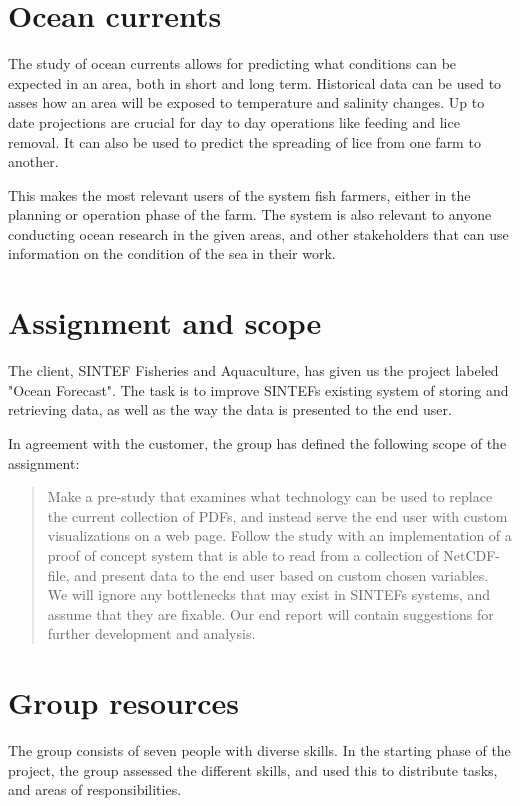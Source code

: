 \documentclass[11pt,a4paper,titlepage,oneside]{report}
\begin{document}
\section{Ocean currents}
The study of ocean currents allows for predicting what conditions can be expected in an area, both in short and long term. Historical data can be used to asses how an area will be exposed to temperature and salinity changes. Up to date projections are crucial for day to day operations like feeding and lice removal. It can also be used to predict the spreading of lice from one farm to another.

This makes the most relevant users of the system fish farmers, either in the planning or operation phase of the farm. The system is also relevant to anyone conducting ocean research in the given areas, and other stakeholders that can use information on the condition of the sea in their work.

\section{Assignment and scope}
The client, SINTEF Fisheries and Aquaculture, has given us the project labeled "Ocean Forecast". The task is to improve SINTEFs existing system of storing and retrieving data, as well as the way the data is presented to the end user. 

In agreement with the customer, the group has defined the following scope of the assignment:

\begin{quote}
Make a pre-study that examines what technology can be used to replace the current collection of PDFs, and instead serve the end user with custom visualizations on a web page. Follow the study with an implementation of a proof of concept system that is able to read from a collection of NetCDF-file, and present data to the end user based on custom chosen variables. We will ignore any bottlenecks that may exist in SINTEFs systems, and assume that they are fixable. Our end report will contain suggestions for further development and analysis.
\end{quote}

\section{Group resources}
The group consists of seven people with diverse skills. In the starting phase of the project, the group assessed the different skills, and used this to distribute tasks, and areas of responsibilities. 
\end{document}
